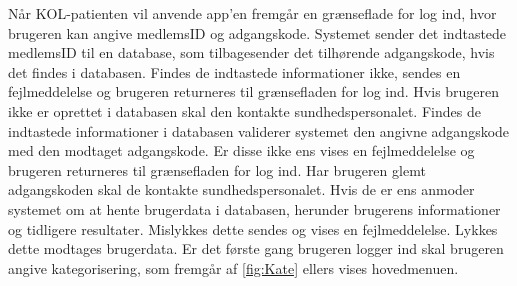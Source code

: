 \noindent
Når KOL-patienten vil anvende app'en fremgår en grænseflade for log ind, hvor brugeren kan angive medlemsID og adgangskode. Systemet sender det indtastede medlemsID til en database, som tilbagesender det tilhørende adgangskode, hvis det findes i databasen. Findes de indtastede informationer ikke, sendes en fejlmeddelelse og brugeren returneres til grænsefladen for log ind. Hvis brugeren ikke er oprettet i databasen skal den kontakte sundhedspersonalet. 
Findes de indtastede informationer i databasen validerer systemet den angivne adgangskode med den modtaget adgangskode. Er disse ikke ens vises en fejlmeddelelse og brugeren returneres til grænsefladen for log ind. Har brugeren glemt adgangskoden skal de kontakte sundhedspersonalet. Hvis de er ens anmoder systemet om at hente brugerdata i databasen, herunder brugerens informationer og tidligere resultater. Mislykkes dette sendes og vises en fejlmeddelelse. Lykkes dette modtages brugerdata. Er det første gang brugeren logger ind skal brugeren angive kategorisering, som fremgår af \autoref{fig:Kate} ellers vises hovedmenuen.

   


